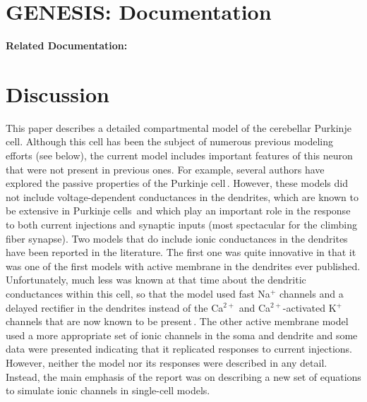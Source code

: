 \documentclass[12pt]{article}
\begin{document}
\section*{GENESIS: Documentation}

{\bf Related Documentation:}

\section*{Discussion}

This paper describes a detailed compartmental model of the
cerebellar Purkinje cell. Although this cell has been the
subject of numerous previous modeling efforts (see below),
the current model includes important features of this neuron
that were not present in previous ones. For example,
several authors have explored the passive properties of the
Purkinje cell\,\cite{Llinas:1976vn, Rapp-M:1992kx, Rapp-M:1994qf, P:1985mb}. 
However, these models did not include
voltage-dependent conductances in the dendrites,
which are known to be extensive in Purkinje cells\,\cite{Llinas:1992rq} 
and which play an important role in
the response to both current injections and synaptic inputs
(most spectacular for the climbing fiber synapse). Two
models that do include ionic conductances in the dendrites
have been reported in the literature. The first one \cite{Pellionisz:1977zr}
was quite innovative in that it was
one of the first models with active membrane in the
dendrites ever published. Unfortunately, much less was known 
at that time about the dendritic conductances within this
cell, so that the model used fast Na$^+$ channels and a delayed
rectifier in the dendrites instead of the Ca$^{2+}$ and Ca$^{2+}$-activated 
K$^+$ channels that are now known to be present\,\cite{R:1980ly, R:1980pi}. 
The other active membrane model\,\cite{Bush:1991ly} used a more appropriate
set of ionic channels in the soma and dendrite and 
some data were presented indicating that it replicated 
responses to current injections. However, neither the model nor
its responses were described in any detail. Instead, the
main emphasis of the report was on describing a new set of
equations to simulate ionic channels in single-cell models.



\end{document}
